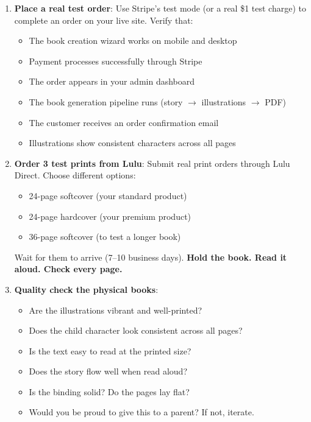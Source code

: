 \documentclass[12pt, letterpaper, oneside]{book}
\begin{document}
\begin{enumerate}[leftmargin=2em, itemsep=6pt, start=24]
  \item \textbf{Place a real test order}: Use Stripe's test mode (or a real \$1 test charge) to complete an order on your live site. Verify that:
  \begin{itemize}[leftmargin=2em]
    \item The book creation wizard works on mobile and desktop
    \item Payment processes successfully through Stripe
    \item The order appears in your admin dashboard
    \item The book generation pipeline runs (story $\rightarrow$ illustrations $\rightarrow$ PDF)
    \item The customer receives an order confirmation email
    \item Illustrations show consistent characters across all pages
  \end{itemize}

  \item \textbf{Order 3 test prints from Lulu}: Submit real print orders through Lulu Direct. Choose different options:
  \begin{itemize}[leftmargin=2em]
    \item 24-page softcover (your standard product)
    \item 24-page hardcover (your premium product)
    \item 36-page softcover (to test a longer book)
  \end{itemize}
  Wait for them to arrive (7--10 business days). \textbf{Hold the book. Read it aloud. Check every page.}

  \item \textbf{Quality check the physical books}:
  \begin{itemize}[leftmargin=2em]
    \item Are the illustrations vibrant and well-printed?
    \item Does the child character look consistent across all pages?
    \item Is the text easy to read at the printed size?
    \item Does the story flow well when read aloud?
    \item Is the binding solid? Do the pages lay flat?
    \item Would you be proud to give this to a parent? If not, iterate.
  \end{itemize}
\end{enumerate}
\end{document}
